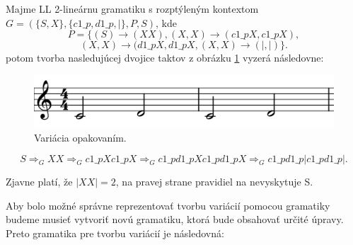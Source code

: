 \begin{example}
Majme LL 2-lineárnu gramatiku s rozptýleným kontextom \\ $G = (\{S,X\},\{c1\_p, d1\_p, |\}, P, S)$, kde $$P = \{(S) \rightarrow (XX), (X,X) \rightarrow (c1\_pX, c1\_pX), $$
$$ (X,X) \rightarrow (d1\_pX, d1\_pX, (X,X) \rightarrow (|, |)\}.$$ potom tvorba nasledujúcej dvojice taktov z obrázku \ref{fig:Priklad1} vyzerá následovne:
\begin{figure}[H]
    \centering
    \includegraphics[scale=0.4]{thesis/obrazky-figures/Priklad1.png}
    \caption{Variácia opakovaním.}
    \label{fig:Priklad1}
\end{figure}
$$S \Rightarrow_G XX \Rightarrow_G c1\_pXc1\_pX \Rightarrow_G c1\_pd1\_pXc1\_pd1\_pX \Rightarrow_G c1\_pd1\_p|c1\_pd1\_p|.$$

Zjavne platí, že $|XX| = 2$, na pravej strane pravidiel na nevyskytuje S.
\end{example}

Aby bolo možné správne reprezentovať tvorbu variácií pomocou gramatiky budeme musieť vytvoriť novú gramatiku, ktorá bude obsahovať určité úpravy. Preto gramatika pre tvorbu variácií je následovná:


